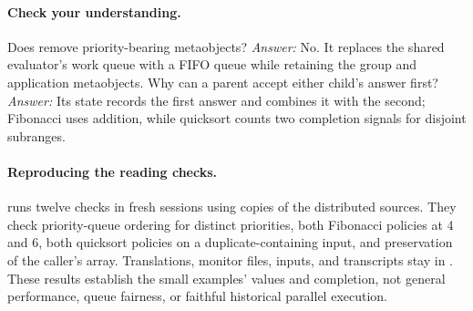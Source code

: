 \paragraph{Check your understanding.}
Does  remove priority-bearing metaobjects?
\emph{Answer:} No. It replaces the shared evaluator's work queue with
a FIFO queue while retaining the group and application metaobjects.
Why can a parent accept either child's answer first?
\emph{Answer:} Its state records the first answer and combines it
with the second; Fibonacci uses addition, while quicksort counts
two completion signals for disjoint subranges.

\paragraph{Reproducing the reading checks.}
 runs twelve checks in fresh
sessions using copies of the distributed sources. They check priority-queue
ordering for distinct priorities, both Fibonacci policies at 4 and 6,
both quicksort policies on a duplicate-containing input, and preservation
of the caller's array. Translations, monitor files, inputs, and
transcripts stay in .
These results establish the small examples' values and completion,
not general performance, queue fairness, or faithful historical
parallel execution.
